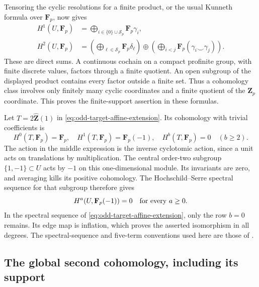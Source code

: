 Tensoring the cyclic resolutions for a finite product,
or the usual Kunneth formula over \(\mathbf F_p\), now
gives
\begin{align}
 H^1(U,\mathbf F_p)
   &=\bigoplus_{i\in\{0\}\cup\mathcal S_p}\mathbf F_p\gamma_i,
       \label{eq:odd-target-unit-H1}\\
 H^2(U,\mathbf F_p)
   &=\left(\bigoplus_{\ell\in\mathcal S_p}\mathbf F_p\delta_\ell\right)
       \oplus
       \left(\bigoplus_{i<j}\mathbf F_p
                                  (\gamma_i\smile\gamma_j)\right).
       \label{eq:odd-target-unit-H2}
\end{align}
These are direct sums.  A continuous cochain on a compact
profinite group, with finite discrete values, factors
through a finite quotient.  An open subgroup of the
displayed product contains every factor outside a
finite set.  Thus a cohomology class involves only
finitely many cyclic coordinates and a finite quotient
of the \(\mathbf Z_p\) coordinate.  This proves the
finite-support assertion in these formulas.

Let \(T=2\widehat{\mathbf Z}(1)\) in
\eqref{eq:odd-target-affine-extension}.  Its cohomology
with trivial coefficients is
\[
 H^0(T,\mathbf F_p)=\mathbf F_p,\quad
 H^1(T,\mathbf F_p)=\mathbf F_p(-1),\quad
 H^b(T,\mathbf F_p)=0\quad(b\ge2).
\]
The action in the middle expression is the inverse
cyclotomic action, since a unit acts on translations
by multiplication.  The central order-two subgroup
\(\{1,-1\}\subset U\) acts by \(-1\) on this
one-dimensional module.  Its invariants are zero,
and averaging kills its positive cohomology.  The
Hochschild--Serre spectral sequence for that subgroup
therefore gives
\[
                         H^a(U,\mathbf F_p(-1))=0
                                      \quad\hbox{for every }a\ge0.
\]
In the spectral sequence of
\eqref{eq:odd-target-affine-extension}, only the
row \(b=0\) remains.  Its edge map is inflation,
which proves the asserted isomorphism in all degrees.
The spectral-sequence and five-term conventions used
here are those of
\cite[II, Remark~1.35, p.~72; \S4, pp.~87--88]{MilneCFT}.

\subsection{The global second cohomology, including its support}

